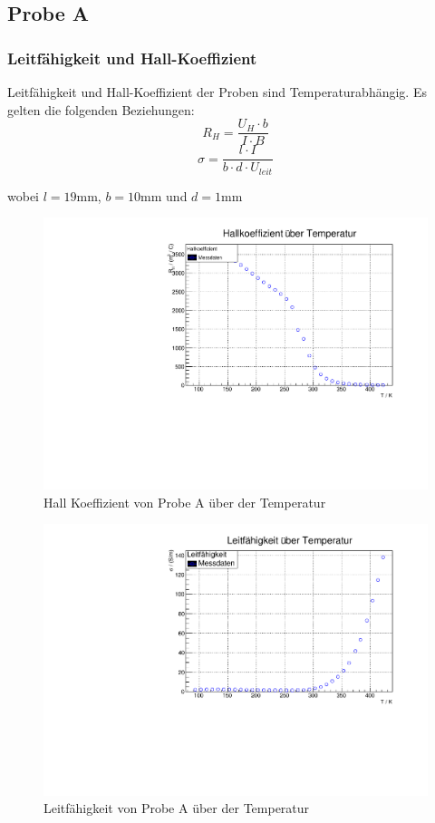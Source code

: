 
\subsection{Probe A}
\subsubsection{Leitfähigkeit und Hall-Koeffizient}

Leitfähigkeit und Hall-Koeffizient der Proben sind Temperaturabhängig.
Es gelten die folgenden Beziehungen:
$$R_H = \frac{U_{H} \cdot b}{ I \cdot B }$$
$$\sigma = \frac{l \cdot I}{b \cdot d \cdot U_{leit}}$$

wobei $l = 19 \text{mm}$, $b = 10 \text{mm}$ und $d = 1 \text{mm}$

\begin{figure}
\label{fig:R_H}
\centering
\includegraphics[scale = 0.5]{../data/A1R_h.pdf}
\caption{Hall Koeffizient von Probe A über der Temperatur}
\end{figure}

\begin{figure}
\label{fig:sigma}
\centering
\includegraphics[scale = 0.5]{../data/A1sigma.pdf}
\caption{Leitfähigkeit von Probe A über der Temperatur}
\end{figure}


